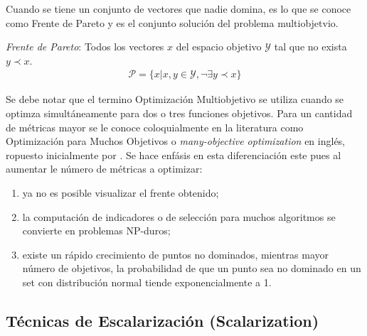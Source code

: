 Cuando se tiene un conjunto de vectores que nadie domina, es lo que se conoce como Frente de Pareto y es el conjunto soluci\'on del problema multiobjetvio.


\begin{definition}
    \textit{Frente de Pareto}: Todos los vectores $x$ del espacio objetivo $\mathcal{Y}$ tal que no exista $y \prec x$.
    \begin{align*}
        \mathcal{P} = \{x| x, y \in \mathcal{Y}, \neg \exists y \prec x \} 
    \end{align*}
\end{definition}

Se debe notar que el termino Optimizaci\'on Multiobjetivo se utiliza cuando se optimza simult\'aneamente para dos o tres funciones objetivos. Para un cantidad de m\'etricas mayor se le conoce coloquialmente en la literatura como Optimizaci\'on para Muchos Objetivos o \textit{many-objective optimization} en ingl\'es, ropuesto inicialmente por \cite{10.1007/978-3-540-31880-4_2}. Se hace enf\'asis en esta  diferenciaci\'on este pues al aumentar le n\'umero de m\'etricas a optimizar:
\begin{enumerate}
    \item ya no es posible visualizar el frente obtenido;
    \item la computaci\'on de indicadores o de selecci\'on para muchos algoritmos se convierte en problemas NP-duros;
    \item existe un r\'apido crecimiento de puntos no dominados, mientras mayor n\'umero de objetivos, la probabilidad de que un punto sea no dominado en un set con distribuci\'on normal tiende exponencialmente a 1.

\end{enumerate}


\subsection{T\'ecnicas de Escalarizaci\'on (Scalarization)}

